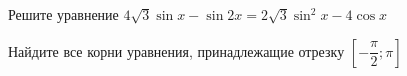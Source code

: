\begin{ex}
	\begin{condition}
		\begin{enumcols}[label=\asbuk*)]
			\item Решите уравнение \( 4\sqrt{3}\sin x - \sin 2x = 2\sqrt{3}\sin^2 x -4\cos x \)
			\item Найдите все корни уравнения, принадлежащие отрезку \( \left[-\dfrac{\pi}{2};\pi\right] \)
		\end{enumcols}
	\end{condition}
\end{ex}